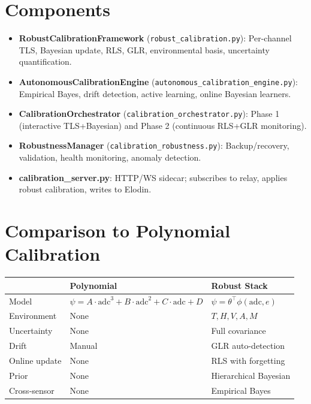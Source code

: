 \documentclass[11pt]{article}
\begin{document}
\section{Components}

\begin{itemize}
\item \textbf{RobustCalibrationFramework} (\texttt{robust\_calibration.py}): Per-channel TLS, Bayesian update, RLS, GLR, environmental basis, uncertainty quantification.
\item \textbf{AutonomousCalibrationEngine} (\texttt{autonomous\_calibration\_engine.py}): Empirical Bayes, drift detection, active learning, online Bayesian learners.
\item \textbf{CalibrationOrchestrator} (\texttt{calibration\_orchestrator.py}): Phase 1 (interactive TLS+Bayesian) and Phase 2 (continuous RLS+GLR monitoring).
\item \textbf{RobustnessManager} (\texttt{calibration\_robustness.py}): Backup/recovery, validation, health monitoring, anomaly detection.
\item \textbf{calibration\_server.py}: HTTP/WS sidecar; subscribes to relay, applies robust calibration, writes to Elodin.
\end{itemize}

\section{Comparison to Polynomial Calibration}

\begin{center}
\begin{tabular}{|l|l|l|}
\hline
 & Polynomial & Robust Stack \\
\hline
Model & $\psi = A \cdot \text{adc}^3 + B \cdot \text{adc}^2 + C \cdot \text{adc} + D$ & $\psi = \theta^\top \phi(\text{adc}, e)$ \\
Environment & None & $T, H, V, A, M$ \\
Uncertainty & None & Full covariance \\
Drift & Manual & GLR auto-detection \\
Online update & None & RLS with forgetting \\
Prior & None & Hierarchical Bayesian \\
Cross-sensor & None & Empirical Bayes \\
\hline
\end{tabular}
\end{center}
\end{document}
